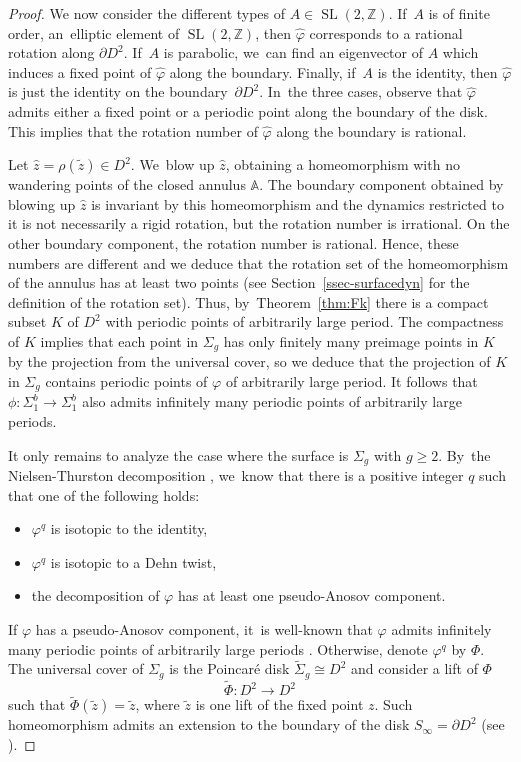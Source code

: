 \documentclass[JEP,XML,SOM,Unicode,NoEqCountersInSection,NoFloatCountersInSection,published]{cedram}
\DeclareMathOperator{\SL}{SL}
\theoremstyle{definition}
\begin{document}
\begin{proof}
We now consider the different types of $A\in \SL(2,\mathbb{Z})$. If~$A$ is of finite order, \ie an~elliptic element of $\SL(2,\mathbb{Z})$, then $\widehat \varphi$ corresponds to a rational rotation along $\partial D^2$. If~$A$ is parabolic, we~can find an eigenvector of $A$ which induces a fixed point of $\widehat \varphi$ along the boundary. Finally, if~$A$ is the identity, then $\widehat \varphi$ is just the identity on the boundary~$\partial D^2$. In~the three cases, observe that $\widehat \varphi$ admits either a fixed point or a periodic point along the boundary of the disk. This implies that the rotation number of $\widehat \varphi$ along the boundary is rational.

Let $\hat z=\rho(\widetilde z)\in D^2$. We~blow up $\hat z$, obtaining a homeomorphism with no wandering points of the closed annulus $\mathbb{A}$. The boundary component obtained by blowing up $\hat z$ is invariant by this homeomorphism and the dynamics restricted to it is not necessarily a rigid rotation, but the rotation number is irrational. On the other boundary component, the rotation number is rational. Hence, these numbers are different and we deduce that the rotation set of the homeomorphism of the annulus has at least two points (see Section~\ref{ssec-surfacedyn} for the definition of the rotation set). Thus, by~Theorem~\ref{thm:Fk} there is a compact subset $K$ of $D^2$ with periodic points of arbitrarily large period. The compactness of $K$ implies that each point in $\Sigma_g$ has only finitely many preimage points in $K$ by the projection from the universal cover, so we deduce that the projection of $K$ in $\Sigma_g$ contains periodic points of $\varphi$ of arbitrarily large period. It follows that $\phi:\Sigma_1^b \to \Sigma_1^b$ also admits infinitely many periodic points of arbitrarily large periods.

It only remains to analyze the case where the surface is $\Sigma_g$ with $g \geq 2$. By~the Nielsen-Thurston decomposition \cite{T, FLP}, we~know that there is a positive integer $q$ such that one of the following holds:
\begin{itemize}
\item
$\varphi^q$ is isotopic to the identity,
\item
$\varphi^q$ is isotopic to a Dehn twist,
\item
the decomposition of $\varphi$ has at least one pseudo-Anosov component.
\end{itemize}
If $\varphi$ has a pseudo-Anosov component, it~is well-known that $\varphi$ admits infinitely many periodic points of arbitrarily large periods \cite{Ha}. Otherwise, denote $\varphi^q$ by $\Phi$. The universal cover of $\Sigma_g$ is the Poincaré disk $\widetilde \Sigma_g \cong D^2$ and consider a lift of $\Phi$
\[
\widetilde \Phi: D^2 \to D^2
\]
such that $\widetilde \Phi(\widetilde z)=\widetilde z$, where $\widetilde z$ is one lift of the fixed point $z$. Such homeomorphism admits an extension to the boundary of the disk $S_\infty=\partial D^2$ (see \eg \cite[Cor.\,1.2]{T}).


\end{proof}
\end{document}
